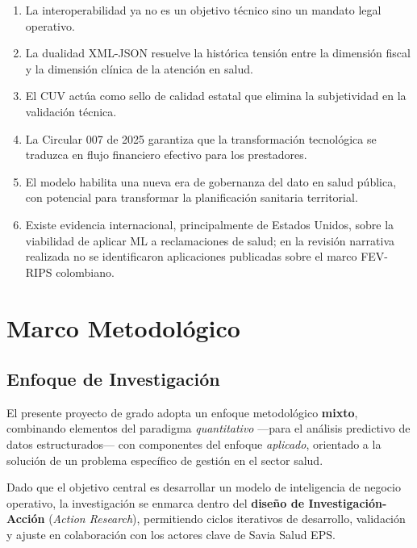\documentclass[12pt,letterpaper]{report}
\begin{document}
\begin{enumerate}
    \item La interoperabilidad ya no es un objetivo técnico sino un mandato legal operativo.
    
    \item La dualidad XML-JSON resuelve la histórica tensión entre la dimensión fiscal y la dimensión clínica de la atención en salud.
    
    \item El CUV actúa como sello de calidad estatal que elimina la subjetividad en la validación técnica.
    
    \item La Circular 007 de 2025 garantiza que la transformación tecnológica se traduzca en flujo financiero efectivo para los prestadores.
    
    \item El modelo habilita una nueva era de gobernanza del dato en salud pública, con potencial para transformar la planificación sanitaria territorial.
    
    \item Existe evidencia internacional, principalmente de Estados Unidos, sobre la viabilidad de aplicar ML a reclamaciones de salud; en la revisión narrativa realizada no se identificaron aplicaciones publicadas sobre el marco FEV-RIPS colombiano.
\end{enumerate}


\chapter{Marco Metodológico}

\section{Enfoque de Investigación}

El presente proyecto de grado adopta un enfoque metodológico \textbf{mixto}, combinando elementos del paradigma \textit{quantitativo} —para el análisis predictivo de datos estructurados— con componentes del enfoque \textit{aplicado}, orientado a la solución de un problema específico de gestión en el sector salud. 

Dado que el objetivo central es desarrollar un modelo de inteligencia de negocio operativo, la investigación se enmarca dentro del \textbf{diseño de Investigación-Acción} (\textit{Action Research}), permitiendo ciclos iterativos de desarrollo, validación y ajuste en colaboración con los actores clave de Savia Salud EPS.
\end{document}
